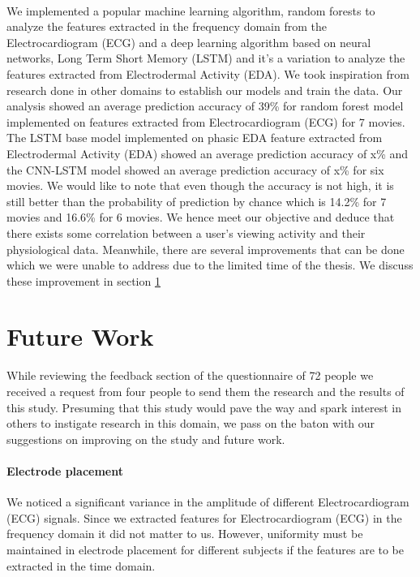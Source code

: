 \paragraph{} We implemented a popular machine learning algorithm, random forests to analyze the features extracted in the frequency domain from the Electrocardiogram (ECG) and a deep learning algorithm based on neural networks, Long Term Short Memory (LSTM) and it's a variation to analyze the features extracted from Electrodermal Activity (EDA). We took inspiration from research done in other domains to establish our models and train the data. Our analysis showed an average prediction accuracy of 39\% for random forest model implemented on features extracted from Electrocardiogram (ECG) for 7 movies. The LSTM base model implemented on phasic EDA feature extracted from Electrodermal Activity (EDA) showed an average prediction accuracy of x\% and the CNN-LSTM model showed an average prediction accuracy of x\% for six movies. We would like to note that even though the accuracy is not high, it is still better than the probability of prediction by chance which is 14.2\% for 7 movies and 16.6\% for 6 movies. We hence meet our objective and deduce that there exists some correlation between a user's viewing activity and their physiological data. Meanwhile, there are several improvements that can be done which we were unable to address due to the limited time of the thesis. We discuss these improvement in section \ref{sec:future_work}

\section{Future Work}
\label{sec:future_work}
While reviewing the feedback section of the questionnaire of 72 people we received a request from four people to send them the research and the results of this study. Presuming that this study would pave the way and spark interest in others to instigate research in this domain, we pass on the baton with our suggestions on improving on the study and future work.

\paragraph{Electrode placement} We noticed a significant variance in the amplitude of different Electrocardiogram (ECG) signals. Since we extracted features for Electrocardiogram (ECG) in the frequency domain it did not matter to us. However, uniformity must be maintained in electrode placement for different subjects if the features are to be extracted in the time domain.

